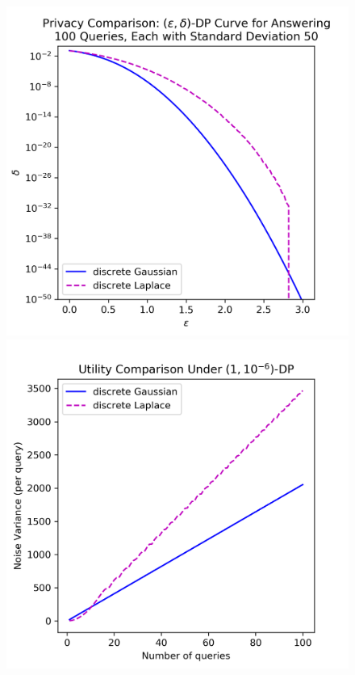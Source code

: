 \documentclass{jpcfinal} %
\begin{document}
\begin{figure}[ht!]
    \centering
    \begin{minipage}{0.5\textwidth}
        \includegraphics[width=\textwidth]{gausslaplace_epsdelta.png}
    \end{minipage}
    \hspace{-10pt}
    \begin{minipage}{0.5\textwidth}
        \includegraphics[width=\textwidth]{gausslaplace_kvar.png}

\end{minipage}
\end{figure}
\end{document}
